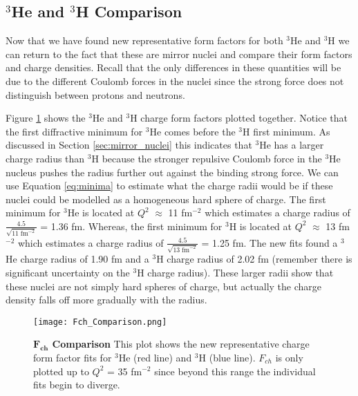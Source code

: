 \subsection{$^3$He and $^3$H Comparison}
\label{ssec:comparison}

Now that we have found new representative form factors for both $^3$He and $^3$H we can return to the fact that these are mirror nuclei and compare their form factors and charge densities. Recall that the only differences in these quantities will be due to the different Coulomb forces in the nuclei since the strong force does not distinguish between protons and neutrons. 

Figure \ref{fig:fch_comparison} shows the $^3$He and $^3$H charge form factors plotted together. Notice that the first diffractive minimum for $^3$He comes before the $^3$H first minimum. As discussed in Section \ref{sec:mirror_nuclei} this indicates that $^3$He has a larger charge radius than $^3$H because the stronger repulsive Coulomb force in the $^3$He nucleus pushes the radius further out against the binding strong force. We can use Equation \ref{eq:minima} to estimate what the charge radii would be if these nuclei could be modelled as a homogeneous hard sphere of charge. The first minimum for $^3$He is located at $Q^2$ $\approx$ 11 fm$^{-2}$ which estimates a charge radius of $\frac{4.5}{\sqrt{11 \; \text{fm}^{-2}}}$ = 1.36 fm. Whereas, the first minimum for $^3$H is located at $Q^2$ $\approx$ 13 fm$^{-2}$ which estimates a charge radius of $\frac{4.5}{\sqrt{13 \; \text{fm}^{-2}}}$ = 1.25 fm. The new fits found a $^3$He charge radius of 1.90 fm and a $^3$H charge radius of 2.02 fm (remember there is significant uncertainty on the $^3$H charge radius). These larger radii show that these nuclei are not simply hard spheres of charge, but actually the charge density falls off more gradually with the radius. 

\begin{figure}[!ht]
	\begin{center}
	\texttt{[image: Fch\_Comparison.png]}
	\end{center}
	\caption[$F_{ch}$ Comparison]{
	{\bf{$\boldsymbol{F_{ch}}$ Comparison}} This plot shows the new representative charge form factor fits for $^3$He (red line) and $^3$H (blue line). $F_{ch}$ is only plotted up to $Q^2$ = 35 fm$^{-2}$ since beyond this range the individual fits begin to diverge.}
	\label{fig:fch_comparison}
\end{figure}

